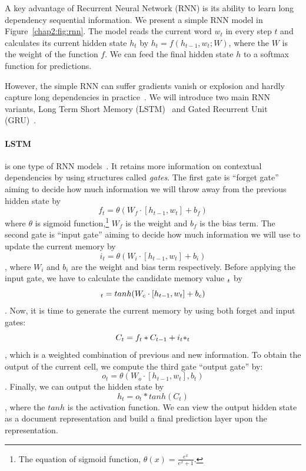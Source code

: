 A key advantage of Recurrent Neural Network (RNN) is its ability to learn long dependency sequential information. 
We present a simple RNN model in Figure~\ref{chap2:fig:rnn}.
The model reads the current word $w_t$ in every step $t$ and calculates its current hidden state $h_t$ by $h_t = f(h_{t-1}, w_t; W)$, where the $W$ is the weight of the function $f$.
We can feed the final hidden state $h$ to a softmax function for predictions.

However, the simple RNN can suffer gradients vanish or explosion and hardly capture long dependencies in practice~\cite{pascanu2013difficulty}.
We will introduce two main RNN variants, Long Term Short Memory (LSTM)~\cite{hochreiter1997long} and Gated Recurrent Unit (GRU)~\cite{chung2014empirical}.

\paragraph{LSTM} is one type of RNN models~\cite{hochreiter1997long}. 
It retains more information on contextual dependencies by using structures called \textit{gates}.
The first gate is ``forget gate'' aiming to decide how much information we will throw away from the previous hidden state by 
$$f_t = \theta(W_f \cdot [h_{t-1}, w_t] + b_f)$$
where $\theta$ is sigmoid function,\footnote{The equation of sigmoid function, $\theta(x) = \frac{e^x}{e^x+1}$.} $W_f$ is the weight and $b_f$ is the bias term.
The second gate is ``input gate'' aiming to decide how much information we will use to update the current memory by
$$i_t = \theta(W_i \cdot [h_{t-1}, w_t] + b_i)$$
, where $W_i$ and $b_i$ are the weight and bias term respectively.
Before applying the input gate, we have to calculate the candidate memory value $\title{C}_t$ by $$\title{C}_t = tanh(W_c \cdot [h_{t-1}, w_t] + b_c)$$.
Now, it is time to generate the current memory by using both forget and input gates:
$$C_t = f_t * C_{t-1} + i_t * \title{C}_t$$, which is a weighted combination of previous and new information.
To obtain the output of the current cell, we compute the third gate ``output gate'' by:
$$o_t = \theta(W_o \cdot [h_{t-1}, w_t], b_t)$$.
Finally, we can output the hidden state by $$h_t = o_t * tanh(C_t)$$, where the $tanh$ is the activation function.
We can view the output hidden state as a document representation and build a final prediction layer upon the representation.



